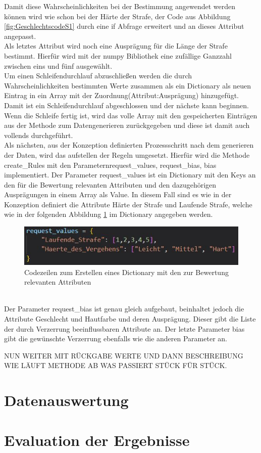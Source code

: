 \begin{onehalfspace}
Damit diese Wahrscheinlichkeiten bei der Bestimmung angewendet werden können wird wie schon bei der Härte der Strafe, der Code aus Abbildung \ref{fig:GeschlechtscodeS1} durch eine if Abfrage erweitert und an dieses Attribut angepasst.\\
Als letztes Attribut wird noch eine Ausprägung für die Länge der Strafe bestimmt. Hierfür wird mit der \glqq{}numpy\grqq{} Bibliothek eine zufällige Ganzzahl zwischen eins und fünf ausgewählt.\\
Um einen Schleifendurchlauf abzuschließen werden die durch Wahrscheinlichkeiten bestimmten Werte zusammen als ein Dictionary als neuen Eintrag in ein Array mit der Zuordnung(Attribut:Ausprägung) hinzugefügt. Damit ist ein Schleifendurchlauf abgeschlossen und der nächste kann beginnen. Wenn die Schleife fertig ist, wird das volle Array mit den gespeicherten Einträgen aus der Methode zum Datengenerieren zurückgegeben und diese ist damit auch vollends durchgeführt.\\
Als nächsten, aus der Konzeption definierten Prozessschritt nach dem generieren der Daten, wird das aufstellen der Regeln umgesetzt. Hierfür wird die Methode \glqq{}create\_Rules\grqq{} mit den Parametern\glqq{}request\_values, request\_bias, bias\grqq{} implementiert. Der Parameter \glqq{}request\_values\grqq{} ist ein Dictionary mit den Keys an den für die Bewertung relevanten Attributen und den dazugehörigen Ausprägungen in einem Array als Value. In diesem Fall sind es wie in der Konzeption definiert die Attribute Härte der Strafe und Laufende Strafe, welche wie in der folgenden Abbildung \ref{fig:RequestValues} im Dictionary angegeben werden.\\
\begin{figure}[h]
    \centering
    \includegraphics{Diagramme/Sz1_RequestValues.JPG}
    \caption{Codezeilen zum Erstellen eines Dictionary mit den zur Bewertung relevanten Attributen}
    \label{fig:RequestValues}
\end{figure}\\
Der Parameter \glqq{}request\_bias\grqq{} ist genau gleich aufgebaut, beinhaltet jedoch die Attribute Geschlecht und Hautfarbe und deren Ausprägung. Dieser gibt die Liste der durch Verzerrung beeinflussbaren Attribute an. Der letzte Parameter \glqq{}bias\grqq{} gibt die gewünschte Verzerrung ebenfalls wie die anderen Parameter an. 

NUN WEITER MIT RÜCKGABE WERTE UND DANN BESCHREIBUNG WIE LÄUFT METHODE AB WAS PASSIERT STÜCK FÜR STÜCK.
\newpage
\section{Datenauswertung}
\label{datenauswerung}
\section{Evaluation der Ergebnisse}
\label{evaluation}
\end{onehalfspace}